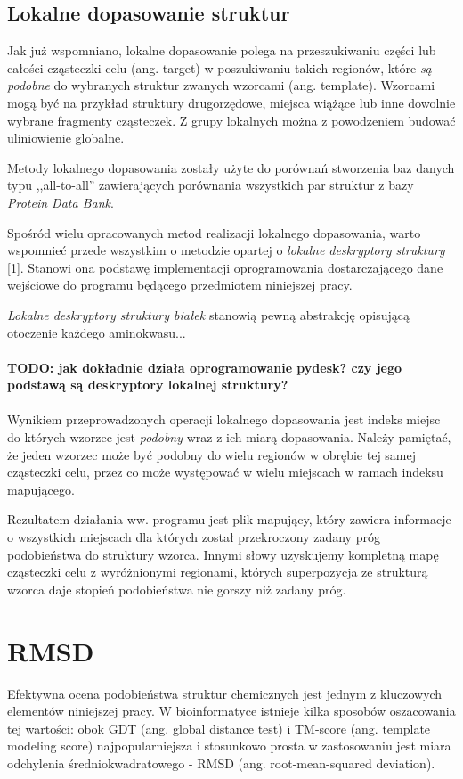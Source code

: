 \documentclass[licencjacka]{pracamgr}
\begin{document}
\subsection{Lokalne dopasowanie struktur} 
Jak już wspomniano, lokalne dopasowanie polega na przeszukiwaniu części lub całości cząsteczki celu (ang. target) w poszukiwaniu takich regionów, które \textit{są podobne} do wybranych struktur zwanych wzorcami (ang. template). Wzorcami mogą być na przykład struktury drugorzędowe, miejsca wiążące lub inne dowolnie wybrane fragmenty cząsteczek. Z grupy lokalnych można z powodzeniem budować uliniowienie globalne.

Metody lokalnego dopasowania zostały użyte do porównań stworzenia baz danych typu ,,all-to-all'' zawierających porównania wszystkich par struktur z bazy \textit{Protein Data Bank}.

Spośród wielu opracowanych metod realizacji lokalnego dopasowania, warto wspomnieć przede wszystkim o metodzie opartej o \textit{lokalne deskryptory struktury} [1]. Stanowi ona podstawę implementacji oprogramowania dostarczającego dane wejściowe do programu będącego przedmiotem niniejszej pracy. 

\textit{Lokalne deskryptory struktury białek} stanowią pewną abstrakcję opisującą otoczenie każdego aminokwasu...
\\
\\
\textbf{TODO: jak dokładnie działa oprogramowanie pydesk? czy jego podstawą są deskryptory lokalnej struktury? }
\\
\\
Wynikiem przeprowadzonych operacji lokalnego dopasowania jest indeks miejsc do których wzorzec jest \textit{podobny} wraz z ich miarą dopasowania. Należy pamiętać, że jeden wzorzec może być podobny do wielu regionów w obrębie tej samej cząsteczki celu, przez co może występować w wielu miejscach w ramach indeksu mapującego.

Rezultatem działania ww. programu jest plik mapujący, który zawiera informacje o wszystkich miejscach dla których został przekroczony zadany próg podobieństwa do struktury wzorca. Innymi słowy uzyskujemy kompletną mapę cząsteczki celu z wyróżnionymi regionami, których superpozycja ze strukturą wzorca daje stopień podobieństwa nie gorszy niż zadany próg.


\section{RMSD}
Efektywna ocena podobieństwa struktur chemicznych jest jednym z kluczowych elementów niniejszej pracy. W bioinformatyce istnieje kilka sposobów oszacowania tej wartości: obok GDT (ang. global distance test) i TM-score (ang. template modeling score) najpopularniejsza i stosunkowo prosta w zastosowaniu jest miara odchylenia średniokwadratowego - RMSD (ang. root-mean-squared deviation). 
\end{document}
